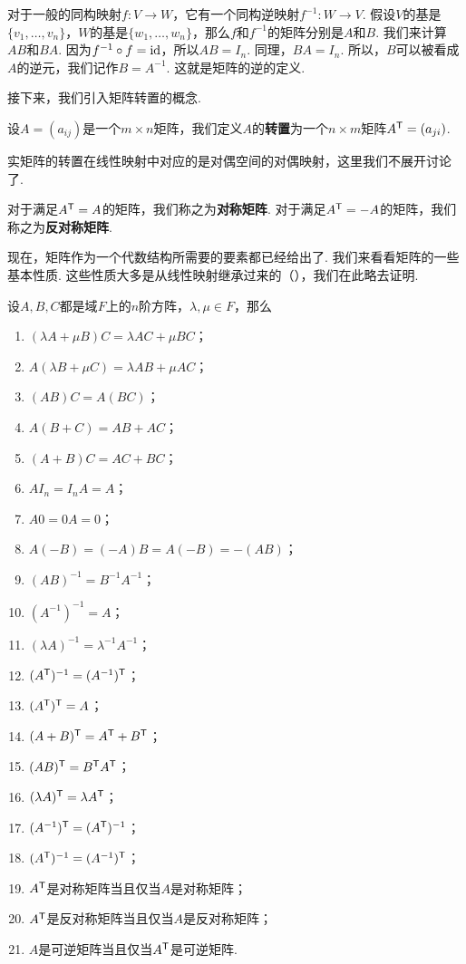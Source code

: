 对于一般的同构映射$f:V\to W$，它有一个同构逆映射$f^{-1}:W\to V$. 假设$V$的基是$\{v_1,\dots,v_n\}$，$W$的基是$\{w_1,\dots,w_n\}$，那么$f$和$f^{-1}$的矩阵分别是$A$和$B$. 我们来计算$AB$和$BA$. 因为$f^{-1}\circ f=\mathrm{id}$，所以$AB=I_n$. 同理，$BA=I_n$. 所以，$B$可以被看成$A$的逆元，我们记作$B=A^{-1}$. 这就是矩阵的逆的定义. 

接下来，我们引入矩阵转置的概念. 

\begin{definition}[矩阵转置]
    设$A=(a_{ij})$是一个$m\times n$矩阵，我们定义$A$的\textbf{转置}为一个$n\times m$矩阵$A^{\mathsf{T}}=(a_{ji})$.
\end{definition}
实矩阵的转置在线性映射中对应的是对偶空间的对偶映射，这里我们不展开讨论了. 

对于满足$A^{\mathsf{T}}=A$的矩阵，我们称之为\textbf{对称矩阵}. 对于满足$A^{\mathsf{T}}=-A$的矩阵，我们称之为\textbf{反对称矩阵}. 

现在，矩阵作为一个代数结构所需要的要素都已经给出了. 我们来看看矩阵的一些基本性质. 这些性质大多是从线性映射继承过来的（），我们在此略去证明. 

\begin{proposition}\label{prop:mat-basic}
    设$A,B,C$都是域$F$上的$n$阶方阵，$\lambda,\mu\in F$，那么
    \begin{enumerate}
        \item $(\lambda A+\mu B)C=\lambda AC+\mu BC$；
        \item $A(\lambda B+\mu C)=\lambda AB+\mu AC$；
        \item $(AB)C=A(BC)$；
        \item $A(B+C)=AB+AC$；
        \item $(A+B)C=AC+BC$；
        \item $AI_n=I_nA=A$；
        \item $A0=0A=0$；
        \item $A(-B)=(-A)B=A(-B)=-(AB)$；
        \item $(AB)^{-1}=B^{-1}A^{-1}$；
        \item $(A^{-1})^{-1}=A$；
        \item $(\lambda A)^{-1}=\lambda^{-1}A^{-1}$；
        \item $(A^{\mathsf{T}} )^{-1}=(A^{-1})^{\mathsf{T}} $；
        \item $(A^{\mathsf{T}} )^{\mathsf{T}} =A$；
        \item $(A+B)^{\mathsf{T}} =A^{\mathsf{T}} +B^{\mathsf{T}} $；
        \item $(AB)^{\mathsf{T}} =B^{\mathsf{T}} A^{\mathsf{T}} $；
        \item $(\lambda A)^{\mathsf{T}} =\lambda A^{\mathsf{T}} $；
        \item $(A^{-1})^{\mathsf{T}} =(A^{\mathsf{T}} )^{-1}$；
        \item $(A^{\mathsf{T}} )^{-1}=(A^{-1})^{\mathsf{T}} $；
        \item $A^{\mathsf{T}} $是对称矩阵当且仅当$A$是对称矩阵；
        \item $A^{\mathsf{T}} $是反对称矩阵当且仅当$A$是反对称矩阵；
        \item $A$是可逆矩阵当且仅当$A^{\mathsf{T}} $是可逆矩阵.
    \end{enumerate}
\end{proposition}

